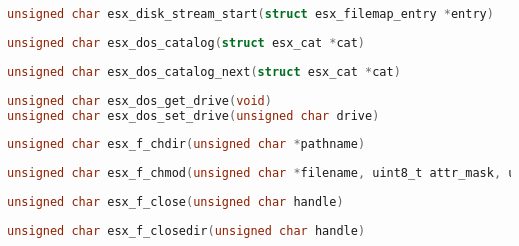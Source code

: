 \documentclass[11pt]{book}
\def\lthtmlcheckvsize{\ifdim\ht\sizebox<\vsize 
  \ifdim\wd\sizebox<\hsize\expandafter\hfill\fi \expandafter\vfill
  \else\expandafter\vss\fi}%
\begin{document}
{\newpage\clearpage
{}%
\begin{lstlisting}[language=C]
unsigned char esx_disk_stream_start(struct esx_filemap_entry *entry)
\end{lstlisting}%
\lthtmlfigureZ
\lthtmlcheckvsize\clearpage}

{\newpage\clearpage
{}%
\begin{lstlisting}[language=C]
unsigned char esx_dos_catalog(struct esx_cat *cat)
\end{lstlisting}%
\lthtmlfigureZ
\lthtmlcheckvsize\clearpage}

{\newpage\clearpage
{}%
\begin{lstlisting}[language=C]
unsigned char esx_dos_catalog_next(struct esx_cat *cat)
\end{lstlisting}%
\lthtmlfigureZ
\lthtmlcheckvsize\clearpage}

{\newpage\clearpage
{}%
\begin{lstlisting}[language=C]
unsigned char esx_dos_get_drive(void)
unsigned char esx_dos_set_drive(unsigned char drive)
\end{lstlisting}%
\lthtmlfigureZ
\lthtmlcheckvsize\clearpage}

{\newpage\clearpage
{}%
\begin{lstlisting}[language=C]
unsigned char esx_f_chdir(unsigned char *pathname)
\end{lstlisting}%
\lthtmlfigureZ
\lthtmlcheckvsize\clearpage}

{\newpage\clearpage
{}%
\begin{lstlisting}[language=C]
unsigned char esx_f_chmod(unsigned char *filename, uint8_t attr_mask, uint8_t attr)
\end{lstlisting}%
\lthtmlfigureZ
\lthtmlcheckvsize\clearpage}

{\newpage\clearpage
{}%
\begin{lstlisting}[language=C]
unsigned char esx_f_close(unsigned char handle)
\end{lstlisting}%
\lthtmlfigureZ
\lthtmlcheckvsize\clearpage}

{\newpage\clearpage
{}%
\begin{lstlisting}[language=C]
unsigned char esx_f_closedir(unsigned char handle)
\end{lstlisting}%
\lthtmlfigureZ
\lthtmlcheckvsize\clearpage}
\end{document}
